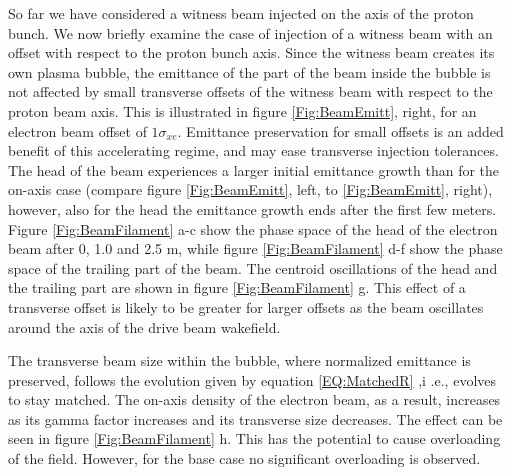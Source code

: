 \documentclass[aps,prstab,reprint,amsmath,amssymb,groupedaddress,onecolumn]{revtex4-1}
\begin{document}
So far we have considered a witness beam injected on the axis of the proton bunch. %
We now briefly examine the case of injection of a witness beam with an offset with respect to the proton bunch axis. %
Since the witness beam creates its own plasma bubble, the emittance of the part of the beam inside the
bubble is not affected by small transverse offsets of the witness beam with respect to the proton beam axis. This is illustrated in figure \ref{Fig:BeamEmitt}, right, for an electron beam offset of $1\sigma_{xe}$. Emittance preservation for small offsets is an added benefit of this 
accelerating regime, and may ease transverse injection tolerances. 
The head of the beam experiences a 
larger initial emittance growth than for the on-axis case (compare figure \ref{Fig:BeamEmitt}, left, to \ref{Fig:BeamEmitt}, right), however, also for the head the emittance growth ends after the first few meters. Figure \ref{Fig:BeamFilament} a-c show the phase space of the head of the electron beam after 0, 1.0 and 2.5 m, while figure \ref{Fig:BeamFilament} d-f show the phase space of the trailing part of the beam.  The centroid oscillations of the head and the trailing part are shown in figure \ref{Fig:BeamFilament} g.  This effect of a transverse offset is likely to be greater for larger offsets as the beam oscillates
around the axis of the drive beam wakefield.%

The transverse beam size within the bubble, where normalized emittance is preserved, follows the evolution given by
equation \ref{EQ:MatchedR} %
,i .e., evolves to stay matched. The on-axis density of the electron
beam, as a result, increases as its gamma factor increases and its transverse size decreases. The effect can be seen in
figure \ref{Fig:BeamFilament} h. This has the potential to cause overloading of the field. However, for the base case
no significant overloading %
is observed.  
\end{document}
